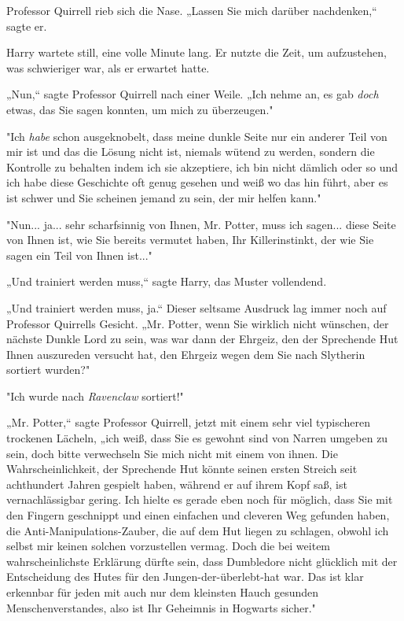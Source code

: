 {Professor Quirrell rieb sich die Nase. „Lassen Sie mich darüber nachdenken,“ sagte er.

Harry wartete still, eine volle Minute lang. Er nutzte die Zeit, um aufzustehen, was schwieriger war, als er erwartet hatte.

„Nun,“ sagte Professor Quirrell nach einer Weile. „Ich nehme an, es gab \emph{doch} etwas, das Sie sagen konnten, um mich zu überzeugen."

"Ich \emph{habe} schon ausgeknobelt, dass meine dunkle Seite nur ein anderer Teil von mir ist und das die Lösung nicht ist, niemals wütend zu werden, sondern die Kontrolle zu behalten indem ich sie akzeptiere, ich bin nicht dämlich oder so und ich habe diese Geschichte oft genug gesehen und weiß wo das hin führt, aber es ist schwer und Sie scheinen jemand zu sein, der mir helfen kann."

"Nun... ja... sehr scharfsinnig von Ihnen, Mr. Potter, muss ich sagen... diese Seite von Ihnen ist, wie Sie bereits vermutet haben, Ihr Killerinstinkt, der wie Sie sagen ein Teil von Ihnen ist..."

„Und trainiert werden muss,“ sagte Harry, das Muster vollendend.

„Und trainiert werden muss, ja.“ Dieser seltsame Ausdruck lag immer noch auf Professor Quirrells Gesicht. „Mr. Potter, wenn Sie wirklich nicht wünschen, der nächste Dunkle Lord zu sein, was war dann der Ehrgeiz, den der Sprechende Hut Ihnen auszureden versucht hat, den Ehrgeiz wegen dem Sie nach Slytherin sortiert wurden?"

"Ich wurde nach \emph{Ravenclaw} sortiert!"

„Mr. Potter,“ sagte Professor Quirrell, jetzt mit einem sehr viel typischeren trockenen Lächeln, „ich weiß, dass Sie es gewohnt sind von Narren umgeben zu sein, doch bitte verwechseln Sie mich nicht mit einem von ihnen. Die Wahrscheinlichkeit, der Sprechende Hut könnte seinen ersten Streich seit achthundert Jahren gespielt haben, während er auf ihrem Kopf saß, ist vernachlässigbar gering. Ich hielte es gerade eben noch für möglich, dass Sie mit den Fingern geschnippt und einen einfachen und cleveren Weg gefunden haben, die Anti-Manipulations-Zauber, die auf dem Hut liegen zu schlagen, obwohl ich selbst mir keinen solchen vorzustellen vermag. Doch die bei weitem wahrscheinlichste Erklärung dürfte sein, dass Dumbledore nicht glücklich mit der Entscheidung des Hutes für den Jungen-der-überlebt-hat war. Das ist klar erkennbar für jeden mit auch nur dem kleinsten Hauch gesunden Menschenverstandes, also ist Ihr Geheimnis in Hogwarts sicher."

}
